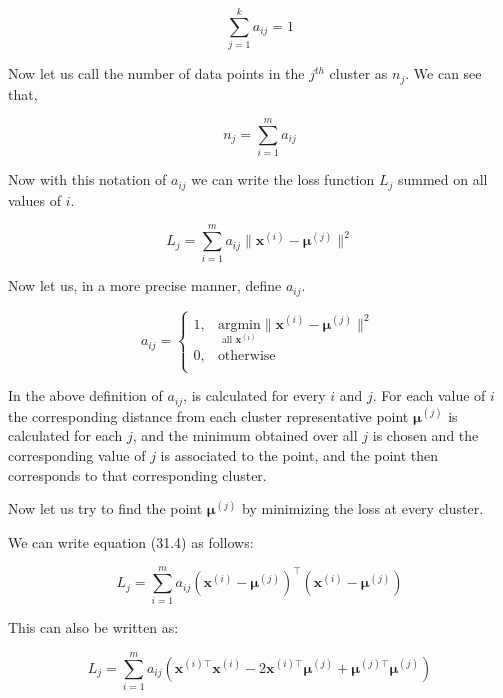 \documentclass[english]{article}
\theoremstyle{plain}
\begin{document}
\begin{equation}
\sum_{j=1}^{k} a_{ij} = 1
\end{equation}

Now let us call the number of data points in the $j^{th}$ cluster as $n_{j}$. We can see that,

\begin{equation}
n_{j} = \sum_{i=1}^{m} a_{ij}
\end{equation}

Now with this notation of $a_{ij}$ we can write the loss function $L_{j}$ summed on all values of $i$.

\begin{equation}
L_{j} = \sum_{i=1}^{m} a_{ij} \| \boldsymbol{x}^{(i)} - \boldsymbol{\mu}^{(j)} \|^{2}
\end{equation}

Now let us, in a more precise manner, define $a_{ij}$.

\begin{equation}
a_{ij} =
\begin{cases}
1, & \underset{\text{all }  \boldsymbol{x}^{(i)}}{\mathrm{argmin}} \| \boldsymbol{x}^{(i)} - \boldsymbol{\mu}^{(j)} \|^{2} \\
0, & \text{otherwise} \\
\end{cases}
\end{equation}

In the above definition of $a_{ij}$, is calculated for every $i$ and $j$. For each value of $i$ the corresponding distance from each cluster representative point $\boldsymbol{\mu}^{(j)}$ is calculated for each $j$, and the minimum obtained over all $j$ is chosen and the corresponding value of $j$ is associated to the point, and the point then corresponds to that corresponding cluster. 

Now let us try to find the point $\boldsymbol{\mu}^{(j)}$ by minimizing the loss at every cluster.

We can write equation (31.4) as follows:

\begin{equation}
L_{j} = \sum_{i=1}^{m} a_{ij} (\boldsymbol{x}^{(i)} - \boldsymbol{\mu}^{(j)})^{\top}(\boldsymbol{x}^{(i)} - \boldsymbol{\mu}^{(j)})
\end{equation}

This can also be written as:

\begin{equation}
L_{j} = \sum_{i=1}^{m} a_{ij} (\boldsymbol{x}^{(i)\top}\boldsymbol{x}^{(i)} -2\boldsymbol{x}^{(i)\top}
\boldsymbol{\mu}^{(j)}+ \boldsymbol{\mu}^{(j)\top}\boldsymbol{\mu}^{(j)})
\end{equation}
\end{document}
